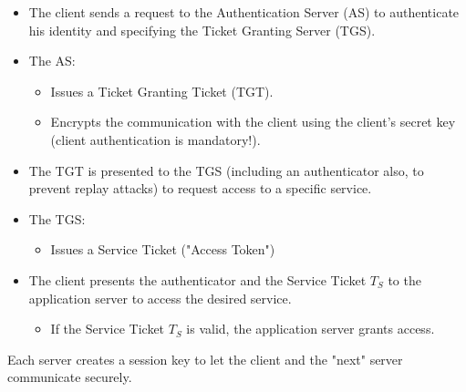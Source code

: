 \begin{itemize}
    \item The client sends a request to the Authentication Server (AS) to authenticate his identity and specifying the Ticket Granting Server (TGS).
    \item The AS:
    \begin{itemize}
        \item Issues a Ticket Granting Ticket (TGT).
        \item Encrypts the communication with the client using the client's secret key (client authentication is mandatory!).
\end{itemize}
    \item The TGT is presented to the TGS (including an authenticator also, to prevent replay attacks) to request access to a specific service.
    \item The TGS:
    \begin{itemize}
        \item Issues a Service Ticket ("Access Token")
    \end{itemize} 
    \item The client presents the authenticator and the Service Ticket $T_S$ to the application server to access the desired service.
    \begin{itemize}
        \item If the Service Ticket $T_S$ is valid, the application server grants access.
    \end{itemize}
\end{itemize}

Each server creates a session key to let the client and the "next" server communicate securely.


